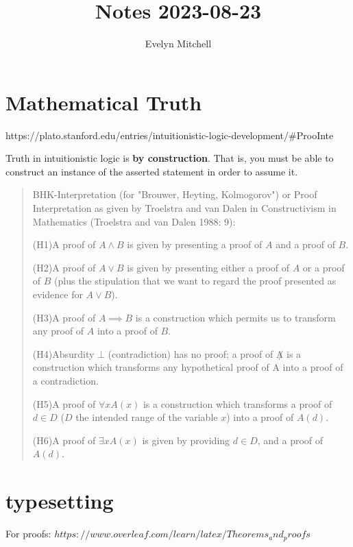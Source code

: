 \documentclass[]{scrartcl}
\title{Notes 2023-08-23}
\author{Evelyn Mitchell}
\begin{document}
\maketitle

\begin{abstract}

\end{abstract}

\section{Mathematical Truth}

https://plato.stanford.edu/entries/intuitionistic-logic-development/\#ProoInte

Truth in intuitionistic logic is \textbf{by construction}. That is, you must be able to construct an instance of the asserted statement in order to assume it.

\begin{quote}
BHK-Interpretation (for "Brouwer, Heyting, Kolmogorov") or Proof Interpretation as given by Troelstra and van Dalen in Constructivism in Mathematics (Troelstra and van Dalen 1988: 9):

(H1)A proof of $A \land B$ is given by presenting a proof of $A$ and a proof of $B$. 

(H2)A proof of $A \lor B$ is given by presenting either a proof of $A$ or a proof of $B$ (plus the stipulation that we want to regard the proof presented as evidence for $A \lor B$). 

(H3)A proof of $A \implies B$ is a construction which permits us to transform any proof of $A$ into a proof of $B$. 

(H4)Absurdity $\bot$ (contradiction) has no proof; a proof of $\not A$ is a construction which transforms any hypothetical proof of A into a proof of a contradiction. 

(H5)A proof of $\forall xA(x)$ is a construction which transforms a proof of $d \in D$ ($D$ the intended range of the variable $x$) into a proof of $A(d)$. 

(H6)A proof of $\exists xA(x)$ is given by providing $d \in D$, and a proof of $A(d)$.
\end{quote}

\section{typesetting}

For proofs: $https://www.overleaf.com/learn/latex/Theorems_and_proofs$
\end{document}
